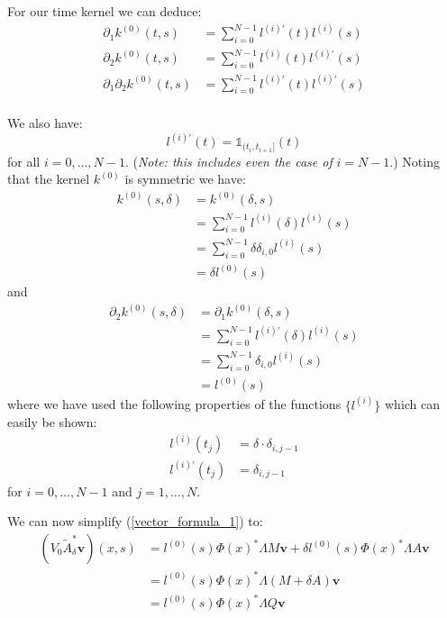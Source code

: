 \documentclass{article}
\theoremstyle{definition}
\theoremstyle{remark}
\theoremstyle{remark}
\begin{document}
\noindent For our time kernel we can deduce:
\begin{align}
    \partial_{1}k^{(0)}(t,s) &= \sum_{i=0}^{N-1}l^{(i)\prime}(t)l^{(i)}(s) \\
    \partial_{2}k^{(0)}(t,s) &= \sum_{i=0}^{N-1}l^{(i)}(t)l^{(i)\prime}(s) \\
    \partial_{1}\partial_{2}k^{(0)}(t,s) &= \sum_{i=0}^{N-1}l^{(i)\prime}(t)l^{(i)\prime}(s) \\
\end{align}

\noindent We also have:
\begin{equation}
    l^{(i)\prime}(t)=\mathbb{1}_{(t_{i},t_{i+1}]}(t)
\end{equation}
for all $i=0,\dots,N-1$. (\textit{Note: this includes even the case of } $i=N-1$.) Noting that the kernel $k^{(0)}$ is symmetric we have:
\begin{align*}
    k^{(0)}(s,\delta) &= k^{(0)}(\delta,s) \\
    &= \sum_{i=0}^{N-1}l^{(i)}(\delta)l^{(i)}(s) \\
    &= \sum_{i=0}^{N-1}\delta \delta_{i,0}l^{(i)}(s) \\
    &= \delta l^{(0)}(s)
\end{align*}
and
\begin{align*}
    \partial_{2}k^{(0)}(s,\delta) &= \partial_{1}k^{(0)}(\delta,s) \\
    &=\sum_{i=0}^{N-1}l^{(i)\prime}(\delta)l^{(i)}(s) \\
    &=\sum_{i=0}^{N-1}\delta_{i,0}l^{(i)}(s) \\
    &=l^{(0)}(s)
\end{align*}
where we have used the following properties of the functions $\{l^{(i)}\}$ which can easily be shown:
\begin{align}
    \label{helpful_identity_1}
    l^{(i)}(t_j) &= \delta\cdot\delta_{i,j-1} \\
    \label{helpful_identity_2}
    l^{(i)\prime}(t_j) &= \delta_{i,j-1}
\end{align}
for $i=0,\dots,N-1$ and $j=1,\dots,N$.

\noindent We can now simplify (\ref{vector_formula_1}) to:
\begin{align}
    (V_{0}\tilde{A}_{\delta}^{*}\boldsymbol{v})(x,s) &= l^{(0)}(s)\Phi(x)^{*}\Lambda M\boldsymbol{v} + \delta l^{(0)}(s)\Phi(x)^{*}\Lambda A \boldsymbol{v} \nonumber \\
    &= l^{(0)}(s)\Phi(x)^{*}\Lambda(M+\delta A)\boldsymbol{v} \nonumber \\
    \label{vector_formula_simplified_1}
    &= l^{(0)}(s)\Phi(x)^{*}\Lambda Q\boldsymbol{v}
\end{align}
\end{document}
